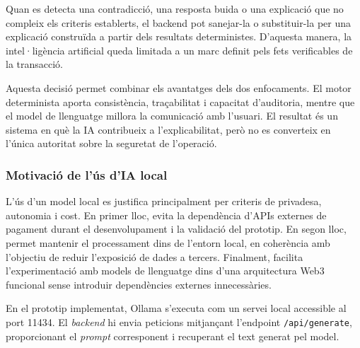Quan es detecta una contradicció, una resposta buida o una explicació que no compleix els criteris establerts, el backend pot sanejar-la o substituir-la per una explicació construïda a partir dels resultats deterministes. D’aquesta manera, la intel·ligència artificial queda limitada a un marc definit pels fets verificables de la transacció.

Aquesta decisió permet combinar els avantatges dels dos enfocaments. El motor determinista aporta consistència, traçabilitat i capacitat d’auditoria, mentre que el model de llenguatge millora la comunicació amb l’usuari. El resultat és un sistema en què la IA contribueix a l’explicabilitat, però no es converteix en l’única autoritat sobre la seguretat de l’operació.

\subsubsection{Motivació de l’ús d’IA local}

L’ús d’un model local es justifica principalment per criteris de privadesa, autonomia i cost. En primer lloc, evita la dependència d’APIs externes de pagament durant el desenvolupament i la validació del prototip. En segon lloc, permet mantenir el processament dins de l’entorn local, en coherència amb l’objectiu de reduir l’exposició de dades a tercers. Finalment, facilita l’experimentació amb models de llenguatge dins d’una arquitectura Web3 funcional sense introduir dependències externes innecessàries.

En el prototip implementat, Ollama s’executa com un servei local accessible al port 11434. El \textit{backend} hi envia peticions mitjançant l’endpoint \texttt{/api/generate}, proporcionant el \textit{prompt} corresponent i recuperant el text generat pel model.
